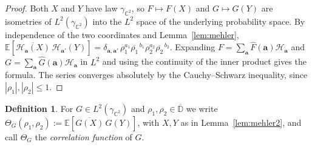 \documentclass[11pt,reqno]{amsart}
\theoremstyle{definition}
\newtheorem{definition}[theorem]{Definition}
\numberwithin{equation}{section}
\newcommand{\C}{\mathbb{C}}
\newcommand{\D}{\mathbb{D}}
\newcommand{\E}{\mathbb{E}}
\newcommand{\gCC}{\gamma_{\C^2}}
\begin{document}
\begin{proof}
Both $X$ and $Y$ have law $\gCC$, so $F\mapsto F(X)$ and $G\mapsto G(Y)$ are isometries of $L^2(\gCC)$ into the $L^2$ space of the underlying probability space. By independence of the two coordinates and Lemma~\ref{lem:mehler}, $\E[\overline{\mathcal{H}_{\mathbf{a}}(X)}\,\mathcal{H}_{\mathbf{a}'}(Y)]=\delta_{\mathbf{a},\mathbf{a}'}\,\rho_1^{a_1}\overline{\rho_1}^{\,b_1}\rho_2^{a_2}\overline{\rho_2}^{\,b_2}$. Expanding $F=\sum_{\mathbf{a}}\widehat{F}(\mathbf{a})\mathcal{H}_{\mathbf{a}}$ and $G=\sum_{\mathbf{a}}\widehat{G}(\mathbf{a})\mathcal{H}_{\mathbf{a}}$ in $L^2$ and using the continuity of the inner product gives the formula. The series converges absolutely by the Cauchy--Schwarz inequality, since $|\rho_1|,|\rho_2|\le1$.
\end{proof}

\begin{definition}\label{def:theta}
For $G\in L^2(\gCC)$ and $\rho_1,\rho_2\in\overline{\D}$ we write $\Theta_G(\rho_1,\rho_2):=\E[\overline{G(X)}\,G(Y)]$, with $X,Y$ as in Lemma~\ref{lem:mehler2}, and call $\Theta_G$ the \emph{correlation function} of $G$.
\end{definition}
\end{document}
